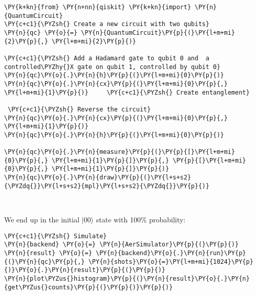     \begin{tcolorbox}[breakable, size=fbox, boxrule=1pt, pad at break*=1mm,colback=cellbackground, colframe=cellborder]
\begin{Verbatim}[commandchars=\\\{\}]
\PY{k+kn}{from} \PY{n+nn}{qiskit} \PY{k+kn}{import} \PY{n}{QuantumCircuit}
\PY{c+c1}{\PYZsh{} Create a new circuit with two qubits}
\PY{n}{qc} \PY{o}{=} \PY{n}{QuantumCircuit}\PY{p}{(}\PY{l+m+mi}{2}\PY{p}{,} \PY{l+m+mi}{2}\PY{p}{)}

\PY{c+c1}{\PYZsh{} Add a Hadamard gate to qubit 0 and  a controlled\PYZhy{}X gate on qubit 1, controlled by qubit 0}
\PY{n}{qc}\PY{o}{.}\PY{n}{h}\PY{p}{(}\PY{l+m+mi}{0}\PY{p}{)}         
\PY{n}{qc}\PY{o}{.}\PY{n}{cx}\PY{p}{(}\PY{l+m+mi}{0}\PY{p}{,} \PY{l+m+mi}{1}\PY{p}{)}     \PY{c+c1}{\PYZsh{} Create entanglement}

 \PY{c+c1}{\PYZsh{} Reverse the circuit}
\PY{n}{qc}\PY{o}{.}\PY{n}{cx}\PY{p}{(}\PY{l+m+mi}{0}\PY{p}{,} \PY{l+m+mi}{1}\PY{p}{)}
\PY{n}{qc}\PY{o}{.}\PY{n}{h}\PY{p}{(}\PY{l+m+mi}{0}\PY{p}{)}

\PY{n}{qc}\PY{o}{.}\PY{n}{measure}\PY{p}{(}\PY{p}{[}\PY{l+m+mi}{0}\PY{p}{,} \PY{l+m+mi}{1}\PY{p}{]}\PY{p}{,} \PY{p}{[}\PY{l+m+mi}{0}\PY{p}{,} \PY{l+m+mi}{1}\PY{p}{]}\PY{p}{)}
\PY{n}{qc}\PY{o}{.}\PY{n}{draw}\PY{p}{(}\PY{l+s+s2}{\PYZdq{}}\PY{l+s+s2}{mpl}\PY{l+s+s2}{\PYZdq{}}\PY{p}{)}
\end{Verbatim}
\end{tcolorbox}
 
            
    
    \begin{center}
    \end{center}
    { \hspace*{\fill} \\}
    

    We end up in the initial \(\lvert 00 \rangle\) state with 100\%
probability:

    \begin{tcolorbox}[breakable, size=fbox, boxrule=1pt, pad at break*=1mm,colback=cellbackground, colframe=cellborder]
\begin{Verbatim}[commandchars=\\\{\}]
\PY{c+c1}{\PYZsh{} Simulate}
\PY{n}{backend} \PY{o}{=} \PY{n}{AerSimulator}\PY{p}{(}\PY{p}{)}
\PY{n}{result} \PY{o}{=} \PY{n}{backend}\PY{o}{.}\PY{n}{run}\PY{p}{(}\PY{n}{qc}\PY{p}{,} \PY{n}{shots}\PY{o}{=}\PY{l+m+mi}{1024}\PY{p}{)}\PY{o}{.}\PY{n}{result}\PY{p}{(}\PY{p}{)}
\PY{n}{plot\PYZus{}histogram}\PY{p}{(}\PY{n}{result}\PY{o}{.}\PY{n}{get\PYZus{}counts}\PY{p}{(}\PY{p}{)}\PY{p}{)}
\end{Verbatim}
\end{tcolorbox}
 
